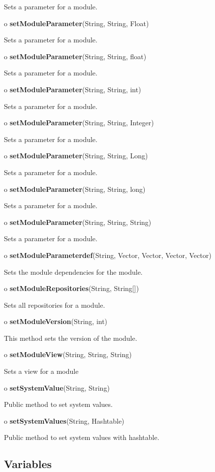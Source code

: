 \begin{description}
Sets a parameter for a module.  
\item o {\bf setModuleParameter}(String, String, Float)  

Sets a parameter for a module.  
\item o {\bf setModuleParameter}(String, String, float)  

Sets a parameter for a module.  
\item o {\bf setModuleParameter}(String, String, int)  

Sets a parameter for a module.  
\item o {\bf setModuleParameter}(String, String, Integer)  

Sets a parameter for a module.  
\item o {\bf setModuleParameter}(String, String, Long)  

Sets a parameter for a module.  
\item o {\bf setModuleParameter}(String, String, long)  

Sets a parameter for a module.  
\item o {\bf setModuleParameter}(String, String, String)  

Sets a parameter for a module.  
\item o {\bf setModuleParameterdef}(String, Vector, Vector, Vector, Vector)  

Sets the module dependencies for the module.  
\item o {\bf setModuleRepositories}(String, String[])  

Sets all repositories for a module.  
\item o {\bf setModuleVersion}(String, int)  

This method sets the version of the module.  
\item o {\bf setModuleView}(String, String, String)  

Sets a view for a module  
\item o {\bf setSystemValue}(String, String)  

Public method to set system values.  
\item o {\bf setSystemValues}(String, Hashtable)  

Public method to set system values with hashtable. 
\end{description}

\subsection*{  Variables }

